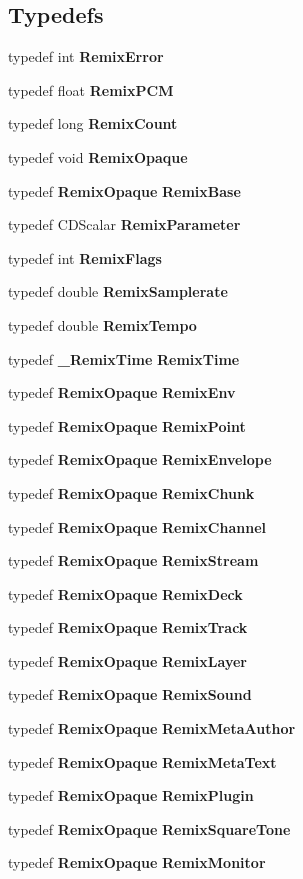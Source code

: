 \subsection*{Typedefs}
\begin{CompactItemize}
\item 
typedef int {\bf Remix\-Error}
\item 
typedef float {\bf Remix\-PCM}
\item 
typedef long {\bf Remix\-Count}
\item 
typedef void {\bf Remix\-Opaque}
\item 
typedef {\bf Remix\-Opaque} {\bf Remix\-Base}
\item 
typedef CDScalar {\bf Remix\-Parameter}
\item 
typedef int {\bf Remix\-Flags}
\item 
typedef double {\bf Remix\-Samplerate}
\item 
typedef double {\bf Remix\-Tempo}
\item 
typedef {\bf \_\-Remix\-Time} {\bf Remix\-Time}
\item 
typedef {\bf Remix\-Opaque} {\bf Remix\-Env}
\item 
typedef {\bf Remix\-Opaque} {\bf Remix\-Point}
\item 
typedef {\bf Remix\-Opaque} {\bf Remix\-Envelope}
\item 
typedef {\bf Remix\-Opaque} {\bf Remix\-Chunk}
\item 
typedef {\bf Remix\-Opaque} {\bf Remix\-Channel}
\item 
typedef {\bf Remix\-Opaque} {\bf Remix\-Stream}
\item 
typedef {\bf Remix\-Opaque} {\bf Remix\-Deck}
\item 
typedef {\bf Remix\-Opaque} {\bf Remix\-Track}
\item 
typedef {\bf Remix\-Opaque} {\bf Remix\-Layer}
\item 
typedef {\bf Remix\-Opaque} {\bf Remix\-Sound}
\item 
typedef {\bf Remix\-Opaque} {\bf Remix\-Meta\-Author}
\item 
typedef {\bf Remix\-Opaque} {\bf Remix\-Meta\-Text}
\item 
typedef {\bf Remix\-Opaque} {\bf Remix\-Plugin}
\item 
typedef {\bf Remix\-Opaque} {\bf Remix\-Square\-Tone}
\item 
typedef {\bf Remix\-Opaque} {\bf Remix\-Monitor}
\end{CompactItemize}
